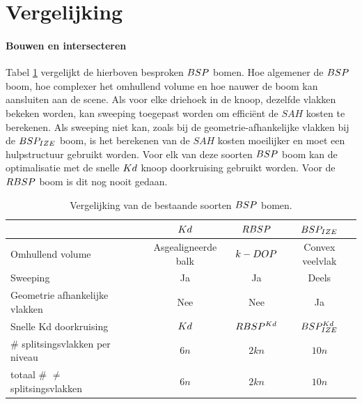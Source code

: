  
\section{Vergelijking}
\paragraph{Bouwen en intersecteren} 
Tabel \ref{tab:boom-vergelijking} vergelijkt de hierboven besproken $BSP$ bomen.
Hoe algemener de $BSP$ boom, hoe complexer het omhullend volume en hoe nauwer de boom kan aansluiten aan de scene.
Als voor elke driehoek in de knoop, dezelfde vlakken bekeken worden, kan sweeping toegepast worden om efficiënt de $SAH$ kosten te berekenen.
Als sweeping niet kan, zoals bij de geometrie-afhankelijke vlakken bij de $BSP_{IZE}$ boom, is het berekenen van de $SAH$ kosten moeilijker en moet een hulpstructuur gebruikt worden.
Voor elk van deze soorten $BSP$ boom kan de optimalisatie met de snelle $Kd$ knoop doorkruising gebruikt worden. Voor de $RBSP$ boom is dit nog nooit gedaan.

\begin{table}[tb]
    \centering
    \begin{tabular}{@{}|l|c|c|c|@{}} \toprule      
            & $Kd$     & $RBSP$ & $BSP_{IZE}$ \\ \midrule
      Omhullend volume & Asgealigneerde balk & $k-DOP$ & Convex veelvlak \\
      Sweeping                              &  Ja   & Ja & Deels    \\
      Geometrie afhankelijke vlakken & Nee & Nee & Ja \\
      Snelle Kd doorkruising                 & $Kd$  & $RBSP^{Kd}$ \footnotemark[1] & $BSP^{Kd}_{IZE}$    \\
      \# splitsingsvlakken per niveau       &  $6n$   & $2kn$ & $10n$  \\
      totaal \# $\neq$ splitsingsvlakken           &  $6n$   & $2kn$ & $10n$     \\ \bottomrule
    \end{tabular}
    \caption{Vergelijking van de bestaande soorten $BSP$ bomen. }
    \label{tab:boom-vergelijking}
  \end{table}


